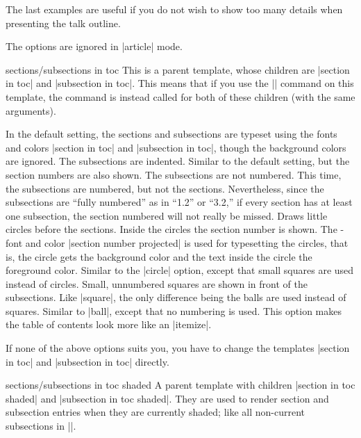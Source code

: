 \begin{command}{\tableofcontents{}}
  The last examples are useful if you do not wish to show too many details when presenting the talk outline.

  \articlenote
  The options are ignored in |article| mode.

  \begin{element}{sections/subsections in toc}\semiyes\no\no
    This is a parent template, whose children are |section in toc| and |subsection in toc|. This means that if you use the |\setbeamertemplate| command on this template, the command is instead called for both of these children (with the same arguments).

    \begin{templateoptions}
      In the default setting, the sections and subsections are typeset using the fonts and colors |section in toc| and |subsection in toc|, though the background colors are ignored. The subsections are indented.
      Similar to the default setting, but the section numbers are also shown. The subsections are not numbered.
      This time, the subsections are numbered, but not the sections. Nevertheless, since the subsections are ``fully numbered'' as in ``1.2'' or ``3.2,'' if every section has at least one subsection, the section numbered will not really be missed.
      Draws little circles before the sections. Inside the circles the section number is shown. The \beamer-font and color |section number projected| is used for typesetting the circles, that is, the circle gets the background color and the text inside the circle the foreground color.
      Similar to the |circle| option, except that small squares are used instead of circles. Small, unnumbered squares are shown in front of the subsections.
      Like |square|, the only difference being the balls are used instead of squares.
      Similar to |ball|, except that no numbering is used. This option makes the table of contents look more like an |itemize|.
    \end{templateoptions}

    If none of the above options suits you, you have to change the templates |section in toc| and |subsection in toc| directly.
  \end{element}

  \begin{element}{sections/subsections in toc shaded}\semiyes\no\no
    A parent template with children |section in toc shaded| and |subsection in toc shaded|. They are used to render section and subsection entries when they are currently shaded; like all non-current subsections in |\tableofcontents[currentsubsection]|.


\end{element}
\end{command}
